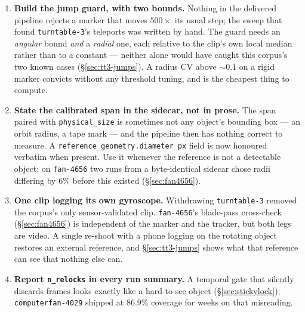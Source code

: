 \documentclass[11pt,a4paper]{article}
\begin{document}
\begin{enumerate}
  \item[\textbf{A.}] \textbf{Build the jump guard, with two bounds.} Nothing in the delivered
  pipeline rejects a marker that moves $500\times$ its usual step; the sweep that found
  \texttt{turntable-3}'s teleports was written by hand. The guard needs an \emph{angular} bound
  \emph{and} a \emph{radial} one, each relative to the clip's own local median rather than to a
  constant --- neither alone would have caught this corpus's two known cases
  (\S\ref{sec:tt3-jumps}). A radius CV above ${\sim}0.1$ on a rigid marker convicts without any
  threshold tuning, and is the cheapest thing to compute.
  \item[\textbf{B.}] \textbf{State the calibrated span in the sidecar, not in prose.} The span
  paired with \texttt{physical\_size} is sometimes not any object's bounding box --- an orbit
  radius, a tape mark --- and the pipeline then has nothing correct to measure. A
  \texttt{reference\_geometry.diameter\_px} field is now honoured verbatim when present. Use it
  whenever the reference is not a detectable object: on \texttt{fan-4656} two runs from a
  byte-identical sidecar chose radii differing by $6\%$ before this existed
  (\S\ref{sec:fan4656}).
  \item[\textbf{C.}] \textbf{One clip logging its own gyroscope.} Withdrawing \texttt{turntable-3}
  removed the corpus's only sensor-validated clip. \texttt{fan-4656}'s blade-pass cross-check
  (\S\ref{sec:fan4656}) is independent of the marker and the tracker, but both legs are video. A
  single re-shoot with a phone logging on the rotating object restores an external reference, and
  \S\ref{sec:tt3-jumps} shows what that reference can see that nothing else can.
  \item[\textbf{D.}] \textbf{Report \texttt{n\_relocks} in every run summary.} A temporal gate
  that silently discards frames looks exactly like a hard-to-see object
  (\S\ref{sec:stickylock}); \texttt{computerfan-4029} shipped at $86.9\%$ coverage for weeks on
  that misreading.
\end{enumerate}
\end{document}
